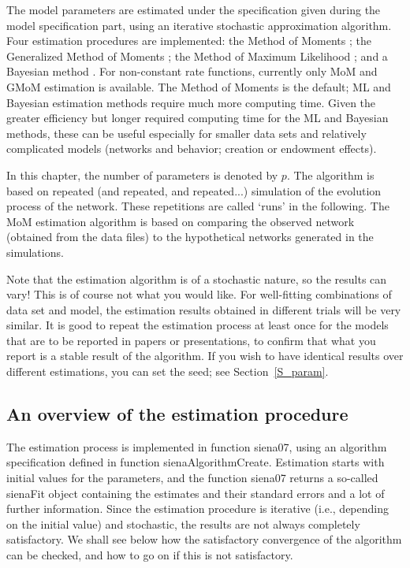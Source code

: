 \documentclass[a4paper,fleqn,11pt]{article}
\newcommand{\+}{\, + \,}
\newcommand{\sfn}[1]{\textsf{#1}}
\begin{document}
The model parameters are estimated under the specification given
during the model specification part, using an iterative stochastic
approximation algorithm.
Four estimation procedures are implemented:
the Method of Moments \citep*[`MoM';][]{Snijders01, SnijdersEA07};
the Generalized Method of Moments \citep*[`GMoM';][]{ASS2015,ASS2019};
 the Method of Maximum Likelihood \citep[`ML';][]{SnijdersEA10a};
 and a Bayesian method
 \citep{Koskinen04, KoskinenSnijders07,SchweinbergerSnijders07c}.
 For non-constant rate functions, currently only
 MoM and GMoM estimation is available.
 The Method of Moments is the default;
 ML and Bayesian estimation methods require much more computing time.
 Given the greater efficiency but longer required computing time
 for the ML and Bayesian methods,
 these can be useful especially for smaller data sets
 and relatively complicated models
 (networks and behavior; creation or endowment effects).

In this chapter, the number of
parameters is denoted by $p$. The algorithm is based on repeated
(and repeated, and repeated...) simulation of the evolution
process of the network. These repetitions are called `runs' in the
following. The MoM estimation algorithm is based on comparing the
observed network (obtained from the data files)
to the hypothetical networks generated in the simulations.

Note that the estimation algorithm is of a stochastic nature, so
the results can vary! This is of course not what you would like.
For well-fitting combinations of data set and model, the
estimation results obtained in different trials will be very
similar. It is good to repeat the estimation process at least once
for the models that are to be reported in papers or presentations,
to confirm that what you report is a stable result of the algorithm.
If you wish to have identical results over different estimations,
you can set the seed; see Section~\ref{S_param}.

\subsection{An overview of the estimation procedure}
\hypertarget{T_S_options}{   }

The estimation process is implemented in function \textsf{siena07},
using an algorithm specification defined in function \textsf{sienaAlgorithmCreate}.
Estimation starts with initial values for the parameters,
and the function \textsf{siena07} %
returns a
so-called \textsf{sienaFit} object containing the estimates and their standard errors and
a lot of further information.
Since the estimation procedure is iterative (i.e., depending on the
initial value) and stochastic,
the results are not always completely satisfactory. We shall see below
how the satisfactory convergence of the algorithm can be checked,
and how to go on if this is not satisfactory.
\end{document}
